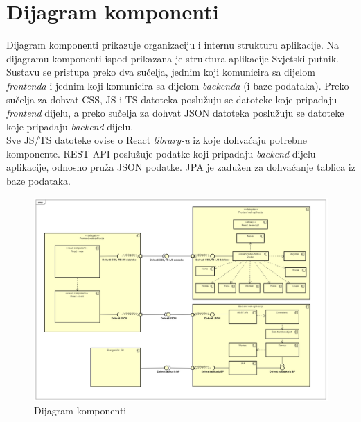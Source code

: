 			\eject
		\section{Dijagram komponenti}


            

            Dijagram komponenti prikazuje organizaciju i internu strukturu aplikacije. Na dijagramu komponenti ispod prikazana je struktura aplikacije Svjetski putnik.
            Sustavu se pristupa preko dva sučelja, jednim koji komunicira sa dijelom \textit{frontenda} i jednim koji komunicira sa dijelom \textit{backenda} (i baze podataka). Preko sučelja za dohvat CSS, JS i TS datoteka poslužuju se datoteke koje pripadaju \textit{frontend} dijelu, a preko sučelja za dohvat JSON datoteka poslužuju se datoteke koje pripadaju \textit{backend} dijelu.
            \\
            Sve JS/TS datoteke ovise o React \textit{library-u} iz koje dohvaćaju potrebne komponente. REST API poslužuje podatke koji pripadaju \textit{backend} dijelu aplikacije, odnosno pruža JSON podatke. JPA je zadužen za dohvaćanje tablica iz baze podataka.

                \begin{figure}[H]
        		\includegraphics[scale=0.3]{slike/Dijagram komponenti.png} %
        		  \centering
        		\caption{Dijagram komponenti}

        	\end{figure}
         \eject